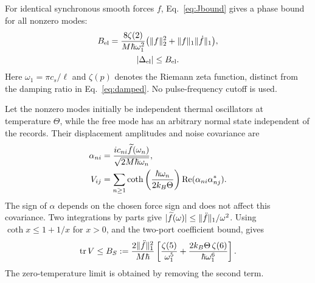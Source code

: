 For identical synchronous smooth forces $f$, Eq.~\eqref{eq:Jbound} gives a phase bound for all nonzero modes:
\begin{equation}
\begin{gathered}
B_{\rm el}=\frac{8\zeta(2)}{M\hbar\omega_1^2}\bigl(\norm f_2^2+\norm f_1\norm{\dot f}_1\bigr),\\
|\Delta_{\rm el}|\le B_{\rm el}.
\end{gathered}
\label{eq:elasticbound}
\end{equation}
Here $\omega_1=\pi c_s/\ell$ and $\zeta(p)$ denotes the Riemann zeta function, distinct from the damping ratio in Eq.~\eqref{eq:damped}. No pulse-frequency cutoff is used.

Let the nonzero modes initially be independent thermal oscillators at temperature $\Theta$, while the free mode has an arbitrary normal state independent of the records. Their displacement amplitudes and noise covariance are
\begin{equation}
\begin{split}
\alpha_{ni}&=\frac{ic_{ni}\wt f(\omega_n)}{\sqrt{2M\hbar\omega_n}},\\
V_{ij}&=\sum_{n\ge1}\coth\left(\frac{\hbar\omega_n}{2k_B\Theta}\right)
\operatorname{Re}(\alpha_{ni}\alpha_{nj}^*).
\end{split}
\label{eq:thermalV}
\end{equation}
The sign of $\alpha$ depends on the chosen force sign and does not affect this covariance. Two integrations by parts give $|\widetilde{f}(\omega)|\le\lVert\ddot f\rVert_1/\omega^2$. Using $\coth x\le1+1/x$ for $x>0$, and the two-port coefficient bound, gives
\begin{equation}
\tr V\le B_S:=\frac{2\norm{\ddot f}_1^2}{M\hbar}
\left[\frac{\zeta(5)}{\omega_1^5}+\frac{2k_B\Theta\,\zeta(6)}{\hbar\omega_1^6}\right].
\label{eq:noisebound}
\end{equation}
The zero-temperature limit is obtained by removing the second term.

